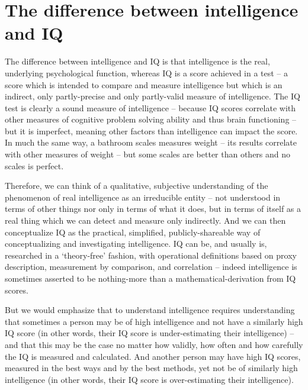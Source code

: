 \documentclass[
]{book}
\begin{document}
\hypertarget{the-difference-between-intelligence-and-iq}{%
\section{The difference between intelligence and IQ}\label{the-difference-between-intelligence-and-iq}}

The difference between intelligence and IQ is that intelligence is the real, underlying psychological function, whereas IQ is a score achieved in a test -- a score which is intended to compare and measure intelligence but which is an indirect, only partly-precise and only partly-valid measure of intelligence. The IQ test is clearly a sound measure of intelligence -- because IQ scores correlate with other measures of cognitive problem solving ability and thus brain functioning -- but it is imperfect, meaning other factors than intelligence can impact the score. In much the same way, a bathroom scales measures weight -- its results correlate with other measures of weight -- but some scales are better than others and no scales is perfect.

Therefore, we can think of a qualitative, subjective understanding of the phenomenon of real intelligence as an irreducible entity -- not understood in terms of other things nor only in terms of what it does, but in terms of itself as a real thing which we can detect and measure only indirectly. And we can then conceptualize IQ as the practical, simplified, publicly-shareable way of conceptualizing and investigating intelligence.
IQ can be, and usually is, researched in a `theory-free' fashion, with operational definitions based on proxy description, measurement by comparison, and correlation -- indeed intelligence is sometimes asserted to be nothing-more than a mathematical-derivation from IQ scores.

But we would emphasize that to understand intelligence requires understanding that sometimes a person may be of high intelligence and not have a similarly high IQ score (in other words, their IQ score is under-estimating their intelligence) -- and that this may be the case no matter how validly, how often and how carefully the IQ is measured and calculated. And another person may have high IQ scores, measured in the best ways and by the best methods, yet not be of similarly high intelligence (in other words, their IQ score is over-estimating their intelligence).
\end{document}
